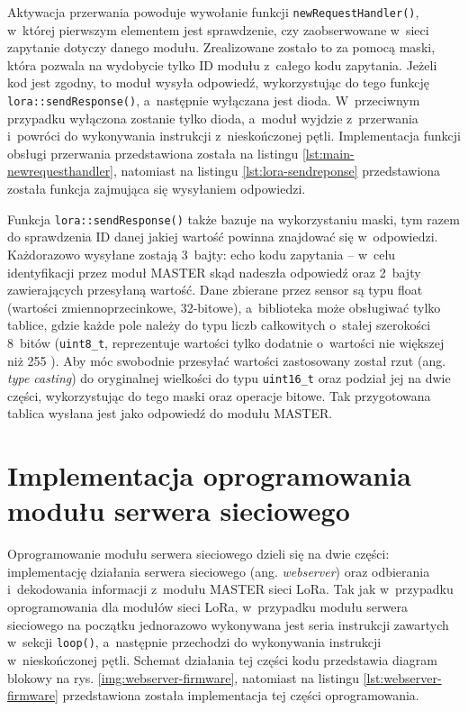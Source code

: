 Aktywacja przerwania powoduje wywołanie funkcji \texttt{newRequestHandler()}, w~której pierwszym elementem jest
sprawdzenie, czy zaobserwowane w~sieci zapytanie dotyczy danego modułu. Zrealizowane zostało to za pomocą maski, która
pozwala na wydobycie tylko ID modułu z~całego kodu zapytania. Jeżeli kod jest zgodny, to moduł wysyła odpowiedź,
wykorzystując do tego funkcję \texttt{lora::sendResponse()}, a~następnie wyłączana jest dioda. W~przeciwnym przypadku
wyłączona zostanie tylko dioda, a~moduł wyjdzie z~przerwania i~powróci do wykonywania instrukcji z~nieskończonej pętli.
Implementacja funkcji obsługi przerwania przedstawiona została na listingu \ref{lst:main-newrequesthandler}, natomiast
na listingu \ref{lst:lora-sendreponse} przedstawiona została funkcja zajmująca się wysyłaniem odpowiedzi.





\FloatBarrier
Funkcja \texttt{lora::sendResponse()} także bazuje na wykorzystaniu maski, tym razem do sprawdzenia ID danej jakiej
wartość powinna znajdować się w~odpowiedzi. Każdorazowo wysyłane zostają 3~bajty: echo kodu zapytania -- w~celu
identyfikacji przez moduł MASTER skąd nadeszła odpowiedź oraz 2~bajty zawierających przesyłaną wartość. Dane zbierane
przez sensor są typu float (wartości zmiennoprzecinkowe, 32-bitowe), a~biblioteka może obsługiwać tylko tablice, gdzie
każde pole należy do typu liczb całkowitych o~stałej szerokości 8~bitów (\texttt{uint8\_t}, reprezentuje wartości tylko
dodatnie o~wartości nie większej niż 255 \cite{cpp-fwinteger}). Aby móc swobodnie przesyłać wartości zastosowany został
rzut (ang. \textsl{type casting}) do oryginalnej wielkości do typu \texttt{uint16\_t} oraz podział jej na dwie części,
wykorzystując do tego maski oraz operacje bitowe. Tak przygotowana tablica wysłana jest jako odpowiedź do modułu MASTER.

\FloatBarrier
\section{Implementacja oprogramowania modułu serwera sieciowego\label{sect:firmware-webserver}} Oprogramowanie modułu
serwera sieciowego dzieli się na dwie części: implementację działania serwera sieciowego (ang. \textsl{webserver}) oraz
odbierania i~dekodowania informacji z~modułu MASTER sieci LoRa. Tak jak w~przypadku oprogramowania dla modułów sieci
LoRa, w~przypadku modułu serwera sieciowego na początku jednorazowo wykonywana jest seria instrukcji zawartych w~sekcji
\texttt{loop()}, a~następnie przechodzi do wykonywania instrukcji w~nieskończonej pętli. Schemat działania tej części
kodu przedstawia diagram blokowy na rys. \ref{img:webserver-firmware}, natomiast na listingu
\ref{lst:webserver-firmware} przedstawiona została implementacja tej części oprogramowania.

